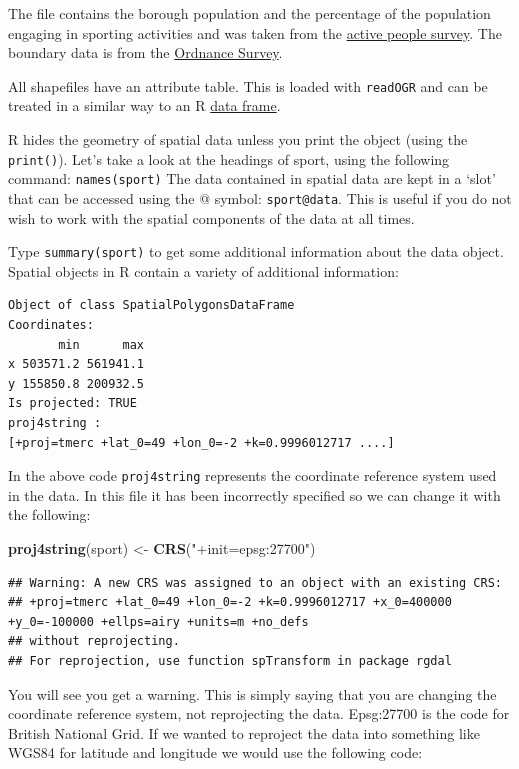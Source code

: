 \documentclass[]{article}
\newenvironment{Shaded}{}{}
\newcommand{\KeywordTok}[1]{\textcolor[rgb]{0.00,0.44,0.13}{\textbf{{#1}}}}
\newcommand{\StringTok}[1]{\textcolor[rgb]{0.25,0.44,0.63}{{#1}}}
\newcommand{\NormalTok}[1]{{#1}}
\begin{document}
The file contains the borough population and the percentage of the
population engaging in sporting activities and was taken from the
\href{http://data.london.gov.uk/datastore/package/active-people-survey-kpi-data-borough}{active
people survey}. The boundary data is from the
\href{http://www.ordnancesurvey.co.uk/oswebsite/opendata/}{Ordnance
Survey}.

All shapefiles have an attribute table. This is loaded with
\texttt{readOGR} and can be treated in a similar way to an R
\href{http://www.statmethods.net/input/datatypes.html}{data frame}.

R hides the geometry of spatial data unless you print the object (using
the \texttt{print()}). Let's take a look at the headings of sport, using
the following command: \texttt{names(sport)} The data contained in
spatial data are kept in a `slot' that can be accessed using the @
symbol: \texttt{sport@data}. This is useful if you do not wish to work
with the spatial components of the data at all times.

Type \texttt{summary(sport)} to get some additional information about
the data object. Spatial objects in R contain a variety of additional
information:

\begin{verbatim}
Object of class SpatialPolygonsDataFrame
Coordinates:
       min      max
x 503571.2 561941.1
y 155850.8 200932.5
Is projected: TRUE 
proj4string :
[+proj=tmerc +lat_0=49 +lon_0=-2 +k=0.9996012717 ....]
\end{verbatim}
In the above code \texttt{proj4string} represents the coordinate
reference system used in the data. In this file it has been incorrectly
specified so we can change it with the following:

\begin{Shaded}
\begin{Highlighting}[]
\KeywordTok{proj4string}\NormalTok{(sport) <- }\KeywordTok{CRS}\NormalTok{(}\StringTok{"+init=epsg:27700"}\NormalTok{)}
\end{Highlighting}
\end{Shaded}
\begin{verbatim}
## Warning: A new CRS was assigned to an object with an existing CRS:
## +proj=tmerc +lat_0=49 +lon_0=-2 +k=0.9996012717 +x_0=400000 +y_0=-100000 +ellps=airy +units=m +no_defs
## without reprojecting.
## For reprojection, use function spTransform in package rgdal
\end{verbatim}
You will see you get a warning. This is simply saying that you are
changing the coordinate reference system, not reprojecting the data.
Epsg:27700 is the code for British National Grid. If we wanted to
reproject the data into something like WGS84 for latitude and longitude
we would use the following code:
\end{document}
